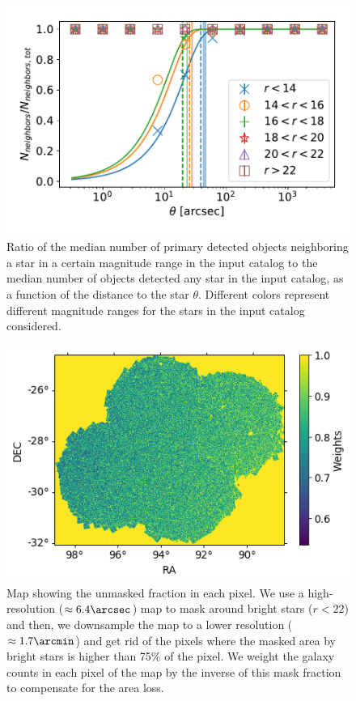 \documentclass[\docopts]{\docclass}
\begin{document}
\begin{figure}
\centering
\includegraphics[width=0.9\columnwidth]{bright_object_masking}
\caption{Ratio of the median number of primary detected objects neighboring a star in a certain magnitude range in the input catalog to the median number of objects detected any star in the input catalog, as a function of the distance to the star $\theta$. Different colors represent different magnitude ranges for the stars in the input catalog considered.}
\label{fig:bright_object_masking}
\end{figure}
\begin{figure}
\centering
\includegraphics[width=0.9\columnwidth]{bo_mask}
\caption{Map showing the unmasked fraction in each pixel. We use a high-resolution ($\approx 6.4 \arcsec$) map to mask around bright stars ($r < 22$) and then, we downsample the map to a lower resolution ($\approx 1.7 \arcmin$) and get rid of the pixels where the masked area by bright stars is higher than 75\% of the pixel. We weight the galaxy counts in each pixel of the map by the inverse of this mask fraction to compensate for the area loss.}
\label{fig:bo_mask}
\end{figure} 
\end{document}
